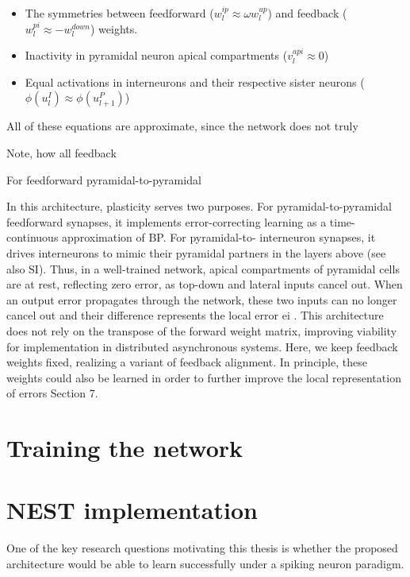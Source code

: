 \begin{itemize}
  \item The symmetries between feedforward ($w_l^{ip} \approx \omega w_l^{up}$) and feedback ($w_l^{pi} \approx -w_l^{down}$)
weights.
  \item Inactivity in pyramidal neuron apical compartments ($v_l^{api} \approx 0$)
  \item Equal activations in interneurons and their respective sister neurons ($\phi (u_l^I) \approx \phi (u_{l+1}^P)$)
\end{itemize}

All of these equations are approximate, since the network does not truly 


Note, how 
all feedback 




For feedforward pyramidal-to-pyramidal

In this architecture, plasticity serves two purposes. For pyramidal-to-pyramidal feedforward synapses, it implements
error-correcting learning as a time-continuous approximation of BP. For pyramidal-to- interneuron synapses, it drives
interneurons to mimic their pyramidal partners in the layers above (see also SI). Thus, in a well-trained network,
apical compartments of pyramidal cells are at rest, reflecting zero error, as top-down and lateral inputs cancel out.
When an output error propagates through the network, these two inputs can no longer cancel out and their difference
represents the local error ei . This architecture does not rely on the transpose of the forward weight matrix, improving
viability for implementation in distributed asynchronous systems. Here, we keep feedback weights fixed, realizing a
variant of feedback alignment. In principle, these weights could also be learned in order to further improve the local
representation of errors Section 7.

\section{Training the network}


\section{NEST implementation}

One of the key research questions motivating this thesis is whether the proposed architecture would be able to learn
successfully under a spiking neuron paradigm.


